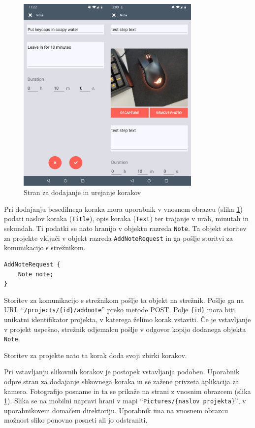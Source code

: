 \documentclass[a4paper, 12pt]{book}
\begin{document}
\begin{figure}[H]
\begin{center}
	\includegraphics[width=9cm]{app_note_image}
\end{center}
	\caption{Stran za dodajanje in urejanje korakov}
\label{app_note}
\end{figure}

Pri dodajanju besedilnega koraka mora uporabnik v vnosnem obrazcu (slika \ref{app_note}) podati naslov koraka (\texttt{Title}), opis koraka (\texttt{Text}) ter trajanje v urah, minutah in sekundah.
Ti podatki se nato hranijo v objektu razreda \texttt{Note}.
Ta objekt storitev za projekte vključi v objekt razreda \texttt{AddNoteRequest} in ga pošlje storitvi za komunikacijo s strežnikom.

\begin{Verbatim}[commandchars=+\[\]]
AddNoteRequest { 
    Note note; 
}
\end{Verbatim}

Storitev za komunikacijo s strežnikom pošlje ta objekt na strežnik.
Pošlje ga na URL \enquote{\texttt{/projects/\{id\}/addnote}} preko metode POST.
Polje \texttt{\{id\}} mora biti unikatni identifikator projekta, v katerega želimo korak vstaviti.
Če je vstavljanje v projekt uspešno, strežnik odjemalcu pošlje v odgovor kopijo dodanega objekta \texttt{Note}.

Storitev za projekte nato ta korak doda svoji zbirki korakov.

Pri vstavljanju slikovnih korakov je postopek vstavljanja podoben.
Uporabnik odpre stran za dodajanje slikovnega koraka in se zažene privzeta aplikacija za kamero.
Fotografijo posname in ta se prikaže na strani z vnosnim obrazcem (slika \ref{app_note}).
Slika se na mobilni napravi hrani v mapi \enquote{\texttt{Pictures/\{naslov projekta\}}}, v uporabnikovem domačem direktoriju.
Uporabnik ima na vnosnem obrazcu možnost sliko ponovno posneti ali jo odstraniti.
\end{document}

